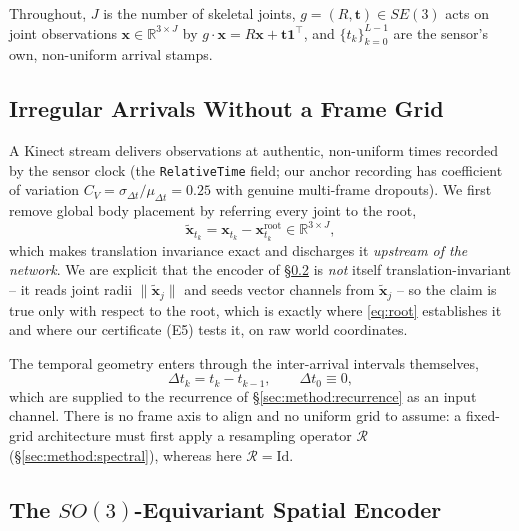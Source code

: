 \documentclass[10pt,journal]{IEEEtran}
\begin{document}
Throughout, $J$ is the number of skeletal joints, $g=(R,\bm{t})\in SE(3)$ acts on joint observations
$\bm{x}\in\mathbb{R}^{3\times J}$ by $g\cdot\bm{x}=R\bm{x}+\bm{t}\mathbf{1}^{\!\top}$, and
$\{t_k\}_{k=0}^{L-1}$ are the sensor's own, non-uniform arrival stamps.

\subsection{Irregular Arrivals Without a Frame Grid}
\label{sec:method:irregular}

A Kinect stream delivers observations at authentic, non-uniform times recorded by the sensor clock
(the \texttt{RelativeTime} field; our anchor recording has coefficient of variation
$C_V=\sigma_{\Delta t}/\mu_{\Delta t}=0.25$ with genuine multi-frame dropouts). We first remove global
body placement by referring every joint to the root,
%
\begin{equation}
\label{eq:root}
\tilde{\bm{x}}_{t_k}=\bm{x}_{t_k}-\bm{x}^{\text{root}}_{t_k}\in\mathbb{R}^{3\times J},
\end{equation}
%
which makes translation invariance exact and discharges it \emph{upstream of the network}. We are
explicit that the encoder of \S\ref{sec:method:encoder} is \emph{not} itself translation-invariant --
it reads joint radii $\|\tilde{\bm{x}}_j\|$ and seeds vector channels from $\tilde{\bm{x}}_j$ -- so
the claim is true only with respect to the root, which is exactly where
\eqref{eq:root} establishes it and where our certificate (E5) tests it, on raw world coordinates.

The temporal geometry enters through the inter-arrival intervals themselves,
%
\begin{equation}
\label{eq:dt}
\Delta t_k = t_k - t_{k-1},\qquad \Delta t_0 \equiv 0 ,
\end{equation}
%
which are supplied to the recurrence of \S\ref{sec:method:recurrence} as an input channel. There is no
frame axis to align and no uniform grid to assume: a fixed-grid architecture must first apply a
resampling operator $\mathcal{R}$ (\S\ref{sec:method:spectral}), whereas here
$\mathcal{R}=\mathrm{Id}$.

\subsection{The $SO(3)$-Equivariant Spatial Encoder}
\label{sec:method:encoder}
\end{document}
